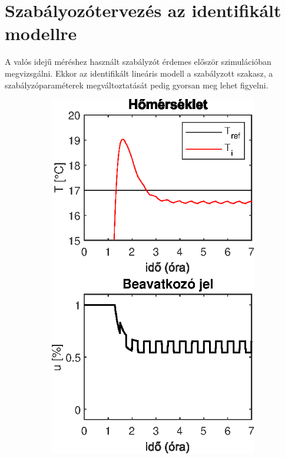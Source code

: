 \section{Szabályozótervezés az identifikált modellre}

A valós idejű méréshez használt szabályzót érdemes először szimulációban megvizsgálni. Ekkor az identifikált lineáris modell a szabályzott szakasz, a szabályzóparaméterek megváltoztatását pedig gyorsan meg lehet figyelni.



\begin{figure}[H]
	\begin{subfigure}[t]{0.32\textwidth}
		\centering
		\includegraphics[width=\textwidth]{figures/realsys/mpc-wy-1}

\end{subfigure}
\end{figure}
